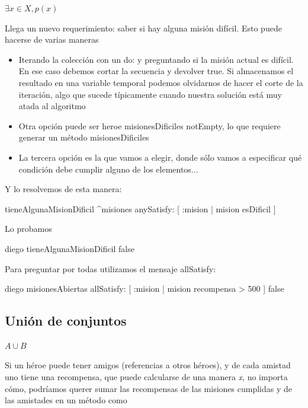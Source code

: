 \documentclass[a4paper,12pt]{book}
\begin{document}
\begin{mdframed}[style=BoxFrame]
\( \exists x \in X, p(x) \)
\end{mdframed}

Llega un nuevo requerimiento: saber si hay alguna misión difícil. Esto puede hacerse de varias maneras

\begin{itemize}
 \item Iterando la colección con un do: y preguntando si la misión actual es difícil. En ese caso debemos
 cortar la secuencia y devolver true. Si almacenamos el resultado en una variable temporal podemos olvidarnos
 de hacer el corte de la iteración, algo que sucede típicamente cuando nuestra solución está muy atada al algoritmo
 \item Otra opción puede ser heroe misionesDificiles notEmpty, lo que requiere generar
 un método misionesDificiles
 \item La tercera opción es la que vamos a elegir, donde sólo vamos a especificar qué condición debe cumplir alguno
 de los elementos...
\end{itemize}

Y lo resolvemos de esta manera:

\begin{code}
tieneAlgunaMisionDificil
      ^misiones anySatisfy: [ :mision | mision esDificil ] 
\end{code}

Lo probamos

\begin{code}
diego tieneAlgunaMisionDificil
    false
\end{code}

Para preguntar por todas utilizamos el mensaje allSatisfy:

\begin{code}
diego misionesAbiertas 
    allSatisfy: [ :mision | mision recompensa > 500 ]
    false
\end{code}

\subsection{Unión de conjuntos}

\begin{mdframed}[style=BoxFrame]
\( A \cup B \)
\end{mdframed}

Si un héroe puede tener amigos (referencias a otros héroes), y de cada amistad uno tiene una recompensa, que 
puede calcularse de una manera \textit{x}, no importa cómo, podríamos querer sumar las recompensas de las misiones
cumplidas y de las amistades en un método como
\end{document}

